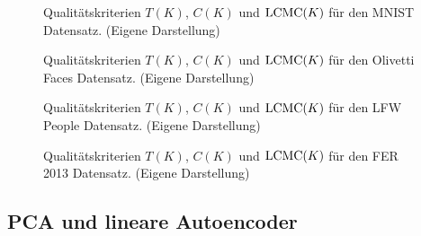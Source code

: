 \begin{figure}[ht]
	\label{fig:MNISTMetrics}
	\begin{center}
		
	\end{center}
	\caption[MNIST Qualitätskriterien]{Qualitätskriterien $T(K)$, $C(K)$ und $\operatorname{LCMC}(K)$ für den MNIST Datensatz. (Eigene Darstellung)}
\end{figure}

\begin{figure}[ht]
	\label{fig:OlivettiFacesMetrics}
	\begin{center}
		
	\end{center}
	\caption[Olivetti Faces Qualitätskriterien]{Qualitätskriterien $T(K)$, $C(K)$ und $\operatorname{LCMC}(K)$ für den Olivetti Faces Datensatz. (Eigene Darstellung)}
\end{figure}

\begin{figure}[ht]
	\label{fig:LfwPeopleMetrics}
	\begin{center}
		
	\end{center}
	\caption[LFW People Qualitätskriterien]{Qualitätskriterien $T(K)$, $C(K)$ und $\operatorname{LCMC}(K)$ für den LFW People Datensatz. (Eigene Darstellung)}
\end{figure}

\begin{figure}[ht]
	\label{fig:FER2013Metrics}
	\begin{center}
		
	\end{center}
	\caption[FER2013 Qualitätskriterien]{Qualitätskriterien $T(K)$, $C(K)$ und $\operatorname{LCMC}(K)$ für den FER 2013 Datensatz. (Eigene Darstellung)}
\end{figure}

\subsection{PCA und lineare Autoencoder}
\label{ch:Vergleich:sec:Resultate:PCA_linearAE}